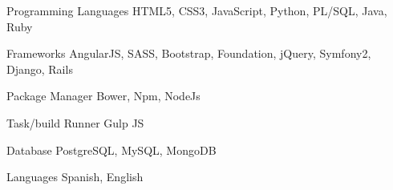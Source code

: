 


\begin{cvskills}


\cvskill
{Programming Languages} %
{HTML5, CSS3, JavaScript, Python, PL/SQL, Java, Ruby} %


\cvskill
{Frameworks} %
{AngularJS, SASS, Bootstrap, Foundation, jQuery, Symfony2, Django, Rails} %


\cvskill
{Package Manager} %
{Bower, Npm, NodeJs} %


\cvskill
{Task/build Runner } %
{Gulp JS} %


\cvskill
{Database} %
{PostgreSQL, MySQL, MongoDB} %


\cvskill
{Languages} %
{Spanish, English} %




\end{cvskills}

